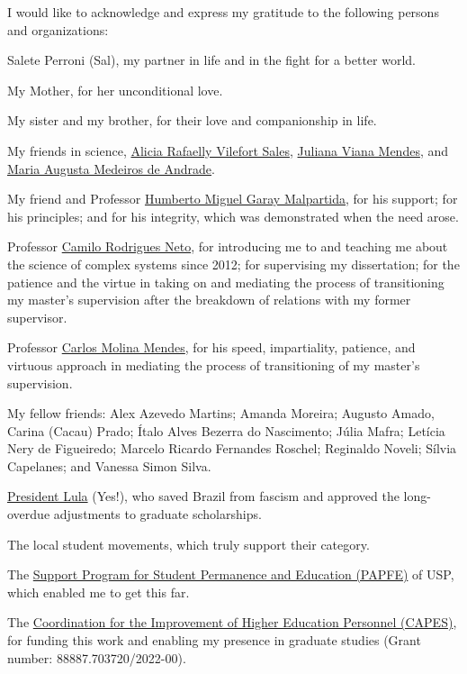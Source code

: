 \documentclass[
12pt,
openright,
oneside,
a4paper,
chapter=TITLE,
section=TITLE,
french,
spanish,
brazil,
english
]{abntex2}\usepackage{array}
\renewcommand{\agradecimentosname}{Acknowledgements}
\renewcommand{\agradecimentosname}{Agradecimentos}
\renewcommand{\agradecimentosname}{Agradecimientos}
\begin{document}

\begin{agradecimentos}[\agradecimentosname]

I would like to acknowledge and express my gratitude to the following
persons and organizations:

Salete Perroni (Sal), my partner in life and in the fight for a better
world.

My Mother, for her unconditional love.

My sister and my brother, for their love and companionship in life.

My friends in science,
\href{https://orcid.org/0000-0003-0004-4487}{Alicia Rafaelly Vilefort
Sales}, \href{https://orcid.org/0000-0002-8222-5240}{Juliana Viana
Mendes}, and \href{https://orcid.org/0000-0002-9283-9967}{Maria Augusta
Medeiros de Andrade}.

My friend and Professor
\href{https://orcid.org/0000-0002-1164-2055}{Humberto Miguel Garay
Malpartida}, for his support; for his principles; and for his integrity,
which was demonstrated when the need arose.

Professor \href{https://orcid.org/0000-0001-6783-6695}{Camilo Rodrigues
Neto}, for introducing me to and teaching me about the science of
complex systems since 2012; for supervising my dissertation; for the
patience and the virtue in taking on and mediating the process of
transitioning my master's supervision after the breakdown of relations
with my former supervisor.

Professor \href{https://orcid.org/0000-0003-2916-4415}{Carlos Molina
Mendes}, for his speed, impartiality, patience, and virtuous approach in
mediating the process of transitioning of my master's supervision.

My fellow friends: Alex Azevedo Martins; Amanda Moreira; Augusto Amado,
Carina (Cacau) Prado; Ítalo Alves Bezerra do Nascimento; Júlia Mafra;
Letícia Nery de Figueiredo; Marcelo Ricardo Fernandes Roschel; Reginaldo
Noveli; Sílvia Capelanes; and Vanessa Simon Silva.

\href{https://lula.com.br/}{President Lula} (Yes!), who saved Brazil
from fascism and approved the long-overdue adjustments to graduate
scholarships.

The local student movements, which truly support their category.

The \href{https://prip.usp.br/apoio-estudantil/}{Support Program for
Student Permanence and Education (PAPFE)} of USP, which enabled me to
get this far.

The \href{https://www.gov.br/capes/}{Coordination for the Improvement of
Higher Education Personnel (CAPES)}, for funding this work and enabling
my presence in graduate studies (Grant number: 88887.703720/2022-00).

\end{agradecimentos}
\end{document}
